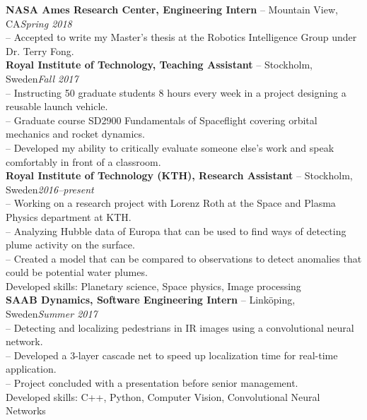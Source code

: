 \documentclass[10pt]{article}
\begin{document}
\noindent\textbf{NASA Ames Research Center, Engineering Intern} -- Mountain View, CA\hfill\textit{Spring 2018}\\
\indent-- Accepted to write my Master's thesis at the Robotics Intelligence Group under Dr. Terry Fong.\\

\noindent\textbf{Royal Institute of Technology, Teaching Assistant} -- Stockholm, Sweden\hfill\textit{Fall 2017}\\
\indent-- Instructing 50 graduate students 8 hours every week in a project designing a reusable launch vehicle.\\
\indent-- Graduate course SD2900 Fundamentals of Spaceflight covering orbital mechanics and rocket dynamics.\\
\indent-- Developed my ability to critically evaluate someone else's work and speak comfortably in front of a classroom.\\

\noindent\textbf{Royal Institute of Technology (KTH), Research Assistant} -- Stockholm, Sweden\hfill\textit{2016--present}\\
\indent-- Working on a research project with Lorenz Roth at the Space and Plasma Physics department at KTH.\\
\indent-- Analyzing Hubble data of Europa that can be used to find ways of detecting plume activity on the surface.\\
\indent-- Created a model that can be compared to observations to detect anomalies that could be potential water plumes.\\
\indent Developed skills: Planetary science, Space physics, Image processing\\

\noindent\textbf{SAAB Dynamics, Software Engineering Intern} -- Linköping, Sweden\hfill\textit{Summer 2017}\\
\indent-- Detecting and localizing pedestrians in IR images using a convolutional neural network.\\
\indent-- Developed a 3-layer cascade net to speed up localization time for real-time application.\\
\indent-- Project concluded with a presentation before senior management.\\
\indent Developed skills: C++, Python, Computer Vision, Convolutional Neural Networks\\
\end{document}
